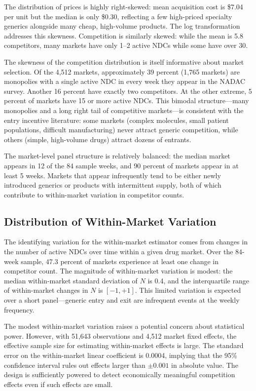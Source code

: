 \documentclass[12pt]{article}
\begin{document}
The distribution of prices is highly right-skewed: mean acquisition cost is \$7.04 per unit but the median is only \$0.30, reflecting a few high-priced specialty generics alongside many cheap, high-volume products. The log transformation addresses this skewness. Competition is similarly skewed: while the mean is 5.8 competitors, many markets have only 1--2 active NDCs while some have over 30.

The skewness of the competition distribution is itself informative about market selection. Of the 4,512 markets, approximately 39 percent (1,765 markets) are monopolies with a single active NDC in every week they appear in the NADAC survey. Another 16 percent have exactly two competitors. At the other extreme, 5 percent of markets have 15 or more active NDCs. This bimodal structure---many monopolies and a long right tail of competitive markets---is consistent with the entry incentive literature: some markets (complex molecules, small patient populations, difficult manufacturing) never attract generic competition, while others (simple, high-volume drugs) attract dozens of entrants.

The market-level panel structure is relatively balanced: the median market appears in 12 of the 84 sample weeks, and 90 percent of markets appear in at least 5 weeks. Markets that appear infrequently tend to be either newly introduced generics or products with intermittent supply, both of which contribute to within-market variation in competitor counts.

\subsection{Distribution of Within-Market Variation}

The identifying variation for the within-market estimator comes from changes in the number of active NDCs over time within a given drug market. Over the 84-week sample, 47.3 percent of markets experience at least one change in competitor count. The magnitude of within-market variation is modest: the median within-market standard deviation of $N$ is 0.4, and the interquartile range of within-market changes in $N$ is $[-1, +1]$. This limited variation is expected over a short panel---generic entry and exit are infrequent events at the weekly frequency.

The modest within-market variation raises a potential concern about statistical power. However, with 51,643 observations and 4,512 market fixed effects, the effective sample size for estimating within-market effects is large. The standard error on the within-market linear coefficient is 0.0004, implying that the 95\% confidence interval rules out effects larger than $\pm 0.001$ in absolute value. The design is sufficiently powered to detect economically meaningful competition effects even if such effects are small.
\end{document}
